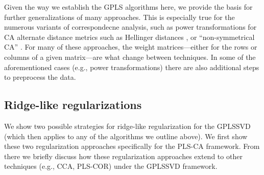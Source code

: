\documentclass[12pt]{article}
\begin{document}
Given the way we establish the GPLS algorithms here, we provide the
basis for further generalizations of many approaches. This is especially
true for the numerous variants of correspondecne analysis, such as power
transformations for CA \citep{greenacre2009power} alternate distance
metrics such as Hellinger distances
\citep{rao1995review, escofier1978analyse}, or ``non-symmetrical CA''
\citep{d1992non, kroonenberg1999nonsymmetric, takane1991relationships}.
For many of these approaches, the weight matrices---either for the rows
or columns of a given matrix---are what change between techniques. In
some of the aforementioned cases (e.g., power transformations) there are
also additional steps to preprocess the data.

\hypertarget{ridge-like-regularizations}{%
\subsection{Ridge-like
regularizations}\label{ridge-like-regularizations}}

We show two possible strategies for ridge-like regularization for the
GPLSSVD (which then applies to any of the algorithms we outline above).
We first show these two regularization approaches specifically for the
PLS-CA framework. From there we briefly discuss how these regularization
approaches extend to other techniques (e.g., CCA, PLS-COR) under the
GPLSSVD framework.
\end{document}
